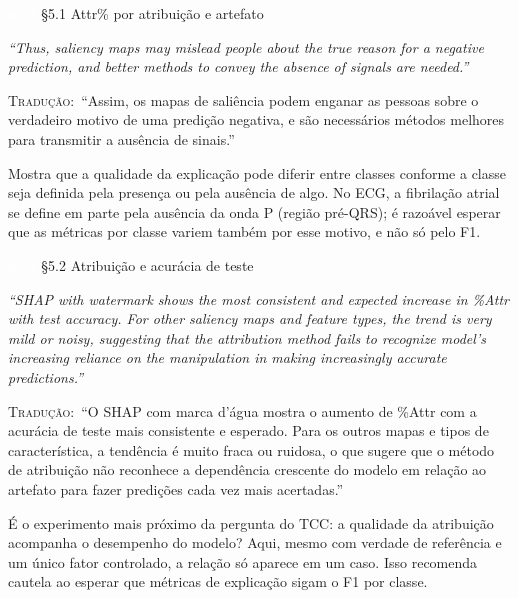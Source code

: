 \documentclass[11pt,a4paper]{article}
\newcommand{\pagechip}[1]{{\setlength{\fboxsep}{1.5pt}\colorbox{cAcc}{\textcolor{white}{\scriptsize\texttt{#1}}}}}
\newenvironment{origquote}{\par\itshape\small}{\par}
\newenvironment{tradquote}{\par\small\textsc{Tradução:}\ }{\par}
\newcommand{\explab}[1]{\par\smallskip{\small\color{cAcc}\textbf{\MakeUppercase{#1}}}\par}
\begin{document}
\begin{citacard}{\pagechip{p. 5} §5.1 Attr\% por atribuição e artefato}
\begin{origquote}“Thus, saliency maps may mislead people about the true reason for a negative prediction, and better methods to convey the absence of signals are needed.”\end{origquote}
\begin{tradquote}“Assim, os mapas de saliência podem enganar as pessoas sobre o verdadeiro motivo de uma predição negativa, e são necessários métodos melhores para transmitir a ausência de sinais.”\end{tradquote}
\explab{Explicação}
Mostra que a qualidade da explicação pode diferir entre classes conforme a classe seja definida pela presença ou pela ausência de algo. No ECG, a fibrilação atrial se define em parte pela ausência da onda P (região pré-QRS); é razoável esperar que as métricas por classe variem também por esse motivo, e não só pelo F1.
\end{citacard}

\begin{citacard}{\pagechip{p. 5} §5.2 Atribuição e acurácia de teste}
\begin{origquote}“SHAP with watermark shows the most consistent and expected increase in \%Attr with test accuracy. For other saliency maps and feature types, the trend is very mild or noisy, suggesting that the attribution method fails to recognize model’s increasing reliance on the manipulation in making increasingly accurate predictions.”\end{origquote}
\begin{tradquote}“O SHAP com marca d'água mostra o aumento de \%Attr com a acurácia de teste mais consistente e esperado. Para os outros mapas e tipos de característica, a tendência é muito fraca ou ruidosa, o que sugere que o método de atribuição não reconhece a dependência crescente do modelo em relação ao artefato para fazer predições cada vez mais acertadas.”\end{tradquote}
\explab{Explicação}
É o experimento mais próximo da pergunta do TCC: a qualidade da atribuição acompanha o desempenho do modelo? Aqui, mesmo com verdade de referência e um único fator controlado, a relação só aparece em um caso. Isso recomenda cautela ao esperar que métricas de explicação sigam o F1 por classe.
\end{citacard}
\end{document}
